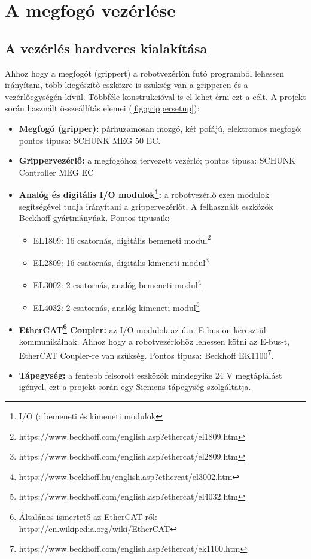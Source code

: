 \documentclass[../documentation.tex]{subfiles}
\begin{document}
\section{A megfogó vezérlése}
\subsection{A vezérlés hardveres kialakítása}
Ahhoz hogy a megfogót (grippert) a robotvezérlőn futó programból lehessen irányítani, több kiegészítő eszközre is szükség van a gripperen és a vezérlőegységén kívül. Többféle konstrukcióval is el lehet érni ezt a célt. A projekt során használt összeállítás elemei (\ref{fig:grippersetup}):
\begin{itemize}
	\item \textbf{Megfogó (gripper):} párhuzamosan mozgó, két pofájú, elektromos megfogó; pontos típusa: SCHUNK MEG 50 EC\cite{grippermanual}.
	\item \textbf{Grippervezérlő:} a megfogóhoz tervezett vezérlő; pontos típusa: SCHUNK Controller MEG EC\cite{grippermanual}
	\item \textbf{Analóg és digitális I/O modulok\footnote{I/O (: bemeneti és kimeneti modulok}:} a robotvezérlő ezen modulok segítségével tudja irányítani a grippervezérlőt. A felhasznált eszközök Beckhoff gyártmányúak. Pontos tipusaik:
	\begin{itemize}
		\item EL1809: 16 csatornás, digitális bemeneti modul\footnote{https://www.beckhoff.com/english.asp?ethercat/el1809.htm}
		\item EL2809: 16 csatornás, digitális kimeneti modul\footnote{https://www.beckhoff.com/english.asp?ethercat/el2809.htm}
		\item EL3002: 2 csatornás, analóg bemeneti modul\footnote{https://www.beckhoff.hu/english.asp?ethercat/el3002.htm}
		\item EL4032: 2 csatornás, analóg kimeneti modul\footnote{https://www.beckhoff.com/english.asp?ethercat/el4032.htm}
	\end{itemize}
	\item \textbf{EtherCAT\footnote{Általános ismertető az EtherCAT-ről: https://en.wikipedia.org/wiki/EtherCAT} Coupler:} az I/O modulok az ú.n. E-bus-on keresztül kommunikálnak. Ahhoz hogy a robotvezérlőhöz lehessen kötni az E-bus-t, EtherCAT Coupler-re van szükség. Pontos tipusa: Beckhoff EK1100\footnote{https://www.beckhoff.com/english.asp?ethercat/ek1100.htm}.
	\item \textbf{Tápegység:} a fentebb felsorolt eszközök mindegyike 24 V megtáplálást igényel, ezt a projekt során egy Siemens tápegység szolgáltatja.
\end{itemize}
\end{document}
